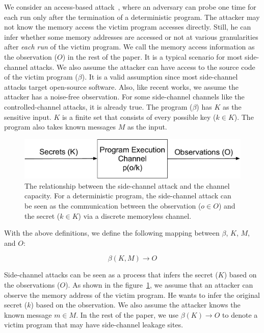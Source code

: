 We consider an access-based attack~\cite{DBLP:journals/jce/GeYCH18}, where an adversary can probe one time for each run only after the termination of a deterministic program. The attacker may not know the memory access the victim program accesses directly. Still, he can infer whether some memory addresses are accessed or not at various granularities after \textit{each run} of the victim program. We call the memory access information as the observation ($O$) in the rest of the paper. It is a typical scenario for most side-channel attacks.  We also assume the attacker can have access to the source code of the victim program ($\beta$). It is a valid assumption since most side-channel attacks target open-source software. Also, like recent works, we assume the attacker has a noise-free observation. For some side-channel channels like the controlled-channel attacks, it is already true. The program ($\beta$) has $K$ as the sensitive input. $K$ is a finite set that consists of every possible key ($k \in K$). The program also takes known messages $M$ as the input. 

\begin{figure}[ht]
  \centering
  \includegraphics[width=.8\columnwidth]{./figures/chapter5/channel.pdf}
  \caption{The relationship between the side-channel attack and the channel capacity. For a deterministic program, the side-channel attack can be seen as the communication between the observation ($o \in O$) and the secret ($k \in K$) via a discrete memoryless channel.}
  \label{fig:side_channel}
\end{figure}

With the above definitions, we define the following mapping between $\beta$,
$K$, $M$, and $O$:

\begin{displaymath}
  \beta(K, M) \rightarrow O
\end{displaymath}


Side-channel attacks can be seen as a process that infers the secret ($K$) based on the observations ($O$). As shown in the figure~\ref{fig:side_channel}, we assume that an attacker can observe the memory address of the victim program. He wants to infer the original secret ($k$) based on the observation. We also assume the attacker knows the known message $m \in M$. In the rest of the paper, we use $\beta(K) \rightarrow O$ to denote a victim program that may have side-channel leakage sites.



